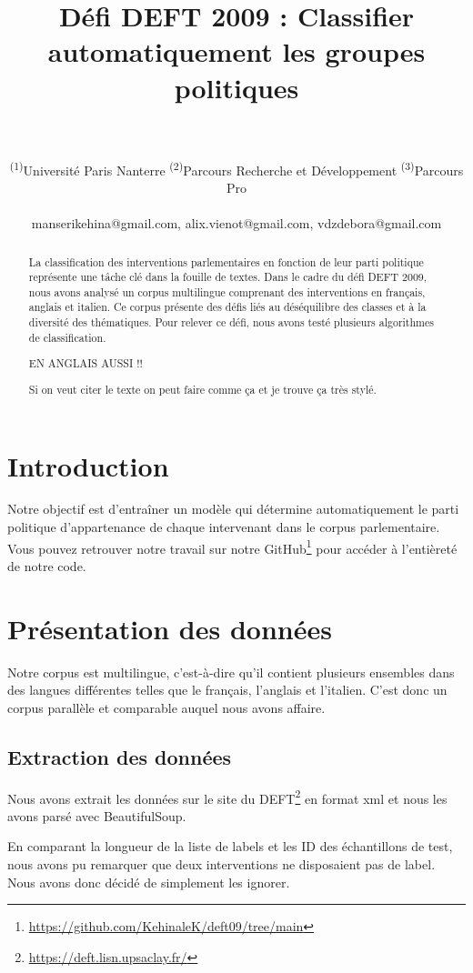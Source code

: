 \documentclass[11pt]{article}
\title{Défi DEFT 2009 : Classifier automatiquement les groupes politiques}
\author{
  \text{MANSERI Kéhina\textsuperscript{(1)(2)}}
  \text{SIRVEN-VIENOT Alix\textsuperscript{(1)(2)}}
  \text{VAN-DEN-ZANDE Débora\textsuperscript{(1)(3)}}
\\
\\
  \textsuperscript{(1)}Université Paris Nanterre
  \textsuperscript{(2)}Parcours Recherche et Développement
  \textsuperscript{(3)}Parcours Pro
\\
\\
    \small {
    manserikehina@gmail.com, alix.vienot@gmail.com, vdzdebora@gmail.com
    }
\\
}
\begin{document}
\maketitle
\begin{abstract}
La classification des interventions parlementaires en fonction de leur parti politique représente une tâche clé dans la fouille de textes. Dans le cadre du défi DEFT 2009, nous avons analysé un corpus multilingue comprenant des interventions en français, anglais et italien. Ce corpus présente des défis liés au déséquilibre des classes et à la diversité des thématiques. Pour relever ce défi, nous avons testé plusieurs algorithmes de classification. 

EN ANGLAIS AUSSI !!


Si on veut citer le texte on peut faire comme ça \cite{forest2009variation} et je trouve ça très stylé.

\end{abstract}

\section{Introduction}
Notre objectif est d'entraîner un modèle qui détermine automatiquement le parti politique d’appartenance de chaque intervenant dans le corpus parlementaire. 
Vous pouvez retrouver notre travail sur notre GitHub\footnote{\url{https://github.com/KehinaleK/deft09/tree/main}} pour accéder à l'entièreté de notre code.

\section{Présentation des données}
Notre corpus est multilingue, c'est-à-dire qu'il contient plusieurs ensembles dans des langues différentes telles que le français, l'anglais et l'italien. C'est donc un corpus parallèle et comparable auquel nous avons affaire. 

\subsection{Extraction des données}
Nous avons extrait les données sur le site du DEFT\footnote{\url{https://deft.lisn.upsaclay.fr/}} en format xml et nous les avons parsé avec BeautifulSoup. 

En comparant la longueur de la liste de labels et les ID des échantillons de test, nous avons pu remarquer que deux interventions ne disposaient pas de label. Nous avons donc décidé de simplement les ignorer.
\end{document}
